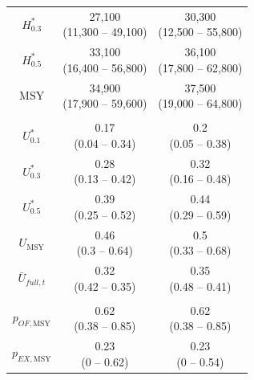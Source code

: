 \documentclass[12pt,]{book}
\theoremstyle{definition}
\theoremstyle{definition}
\theoremstyle{definition}
\theoremstyle{remark}
\begin{document}
\begin{table}
\begin{tabular}[t]{ccc}
\hspace{1em}$H^*_{0.3}$ & \makecell[c]{27,100\\(11,300 -- 49,100)} & \makecell[c]{30,300\\(12,500 -- 55,800)}\\
\hspace{1em}$H^*_{0.5}$ & \makecell[c]{33,100\\(16,400 -- 56,800)} & \makecell[c]{36,100\\(17,800 -- 62,800)}\\
\hspace{1em}$\text{MSY}$ & \makecell[c]{34,900\\(17,900 -- 59,600)} & \makecell[c]{37,500\\(19,000 -- 64,800)}\\
\addlinespace[0.3em]
\multicolumn{3}{l}{\textbf{Exploitation Rate}}\\
\hline
\hspace{1em}$U^*_{0.1}$ & \makecell[c]{0.17\\(0.04 -- 0.34)} & \makecell[c]{0.2\\(0.05 -- 0.38)}\\
\hspace{1em}$U^*_{0.3}$ & \makecell[c]{0.28\\(0.13 -- 0.42)} & \makecell[c]{0.32\\(0.16 -- 0.48)}\\
\hspace{1em}$U^*_{0.5}$ & \makecell[c]{0.39\\(0.25 -- 0.52)} & \makecell[c]{0.44\\(0.29 -- 0.59)}\\
\hspace{1em}$U_{\text{MSY}}$ & \makecell[c]{0.46\\(0.3 -- 0.64)} & \makecell[c]{0.5\\(0.33 -- 0.68)}\\
\hspace{1em}$\bar{U}_{full,t}$ & \makecell[c]{0.32\\(0.42 -- 0.35)} & \makecell[c]{0.35\\(0.48 -- 0.41)}\\
\addlinespace[0.3em]
\multicolumn{3}{l}{\textbf{Biodiversity}}\\
\hline
\hspace{1em}$p_{OF,\text{MSY}}$ & \makecell[c]{0.62\\(0.38 -- 0.85)} & \makecell[c]{0.62\\(0.38 -- 0.85)}\\
\hspace{1em}$p_{EX,\text{MSY}}$ & \makecell[c]{0.23\\(0 -- 0.62)} & \makecell[c]{0.23\\(0 -- 0.54)}\\
\bottomrule
\end{tabular}
\end{table}
\end{document}
